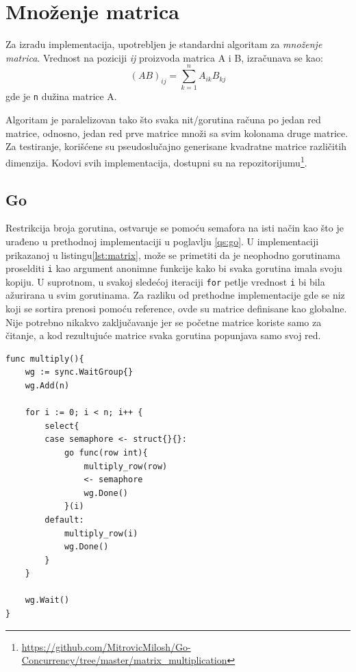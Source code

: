 \documentclass[12pt,oneside]{memoir}
\begin{document}

\section{Množenje matrica}
Za izradu implementacija, upotrebljen je standardni algoritam za \textit{množenje matrica}. Vrednost na poziciji \textit{ij} proizvoda matrica A i B, izračunava se kao: $$(AB)_{ij} = \sum_{k=1}^{n} A_{ik}B_{kj}$$ gde je \texttt{n} dužina matrice A. 

Algoritam je paralelizovan tako što svaka nit/gorutina računa po jedan red matrice, odnosno, jedan red prve matrice množi sa svim kolonama druge matrice. Za testiranje, korišćene su pseudoslučajno generisane kvadratne matrice različitih dimenzija. Kodovi svih implementacija, dostupni su na repozitorijumu\footnote{\url{https://github.com/MitrovicMilosh/Go-Concurrency/tree/master/matrix_multiplication}}.

\subsection{Go}
Restrikcija broja gorutina, ostvaruje se pomoću semafora na isti način kao što je urađeno u prethodnoj implementaciji u poglavlju \ref{qs:go}. U implementaciji prikazanoj u listingu\ref{lst:matrix}, može se primetiti da je neophodno gorutinama proselditi \texttt{i} kao argument anonimne funkcije kako bi svaka gorutina imala svoju kopiju. U suprotnom, u svakoj sledećoj iteraciji \texttt{for} petlje vrednost \texttt{i} bi bila ažurirana u svim gorutinama. Za razliku od prethodne implementacije gde se niz koji se sortira prenosi pomoću reference, ovde su matrice definisane kao globalne. Nije potrebno nikakvo zaključavanje jer se početne matrice koriste samo za čitanje, a kod rezultujuće matrice svaka gorutina popunjava samo svoj red. 

\begin{center}
\begin{lstlisting}[caption=Go implementacija konkurentne funkcije za množenje matrica,label={lst:matrix}, backgroundcolor=\color{background}]
func multiply(){
	wg := sync.WaitGroup{}
	wg.Add(n)

	for i := 0; i < n; i++ {
		select{
		case semaphore <- struct{}{}:
			go func(row int){
				multiply_row(row)
				<- semaphore
				wg.Done()
			}(i)
		default:
			multiply_row(i)
			wg.Done()
		}
	}

	wg.Wait()
}
\end{lstlisting}
\end{center}
\end{document}
